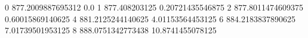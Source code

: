 0 877.2009887695312 0.0
1 877.408203125 0.20721435546875
2 877.8011474609375 0.60015869140625
4 881.2125244140625 4.01153564453125
6 884.2183837890625 7.01739501953125
8 888.0751342773438 10.8741455078125
